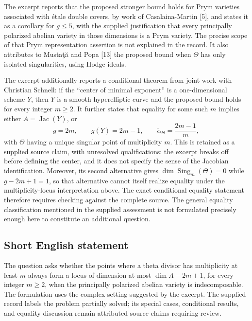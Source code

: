 \documentclass[11pt]{article}
\begin{document}
The excerpt reports that the proposed stronger bound holds for Prym varieties associated with \'etale double covers, by work of Casalaina-Martin [5], and states it as a corollary for \(g\leq5\), with the supplied justification that every principally polarized abelian variety in those dimensions is a Prym variety. The precise scope of that Prym representation assertion is not explained in the record. It also attributes to Musta\c{t}\u{a} and Popa [13] the proposed bound when \(\Theta\) has only isolated singularities, using Hodge ideals.

The excerpt additionally reports a conditional theorem from joint work with Christian Schnell: if the ``center of minimal exponent'' is a one-dimensional scheme \(Y\), then \(Y\) is a smooth hyperelliptic curve and the proposed bound holds for every integer \(m\geq2\). It further states that equality for some such \(m\) implies either \(A=\operatorname{Jac}(Y)\), or
\[
 g=2m,\qquad g(Y)=2m-1,\qquad
 \widetilde\alpha_{\Theta}=\frac{2m-1}{m},
\]
with \(\Theta\) having a unique singular point of multiplicity \(m\). This is retained as a supplied source claim, with unresolved qualifications: the excerpt breaks off before defining the center, and it does not specify the sense of the Jacobian identification. Moreover, its second alternative gives \(\dim\operatorname{Sing}_{m}(\Theta)=0\) while \(g-2m+1=1\), so that alternative cannot itself realize equality under the multiplicity-locus interpretation above. The exact conditional equality statement therefore requires checking against the complete source. The general equality classification mentioned in the supplied assessment is not formulated precisely enough here to constitute an additional question.
\subsection{Short English statement}
The question asks whether the points where a theta divisor has multiplicity at least \(m\) always form a locus of dimension at most \(\dim A-2m+1\), for every integer \(m\geq2\), when the principally polarized abelian variety is indecomposable. The formulation uses the complex setting suggested by the excerpt. The supplied record labels the problem partially solved; its special cases, conditional results, and equality discussion remain attributed source claims requiring review.
\end{document}
